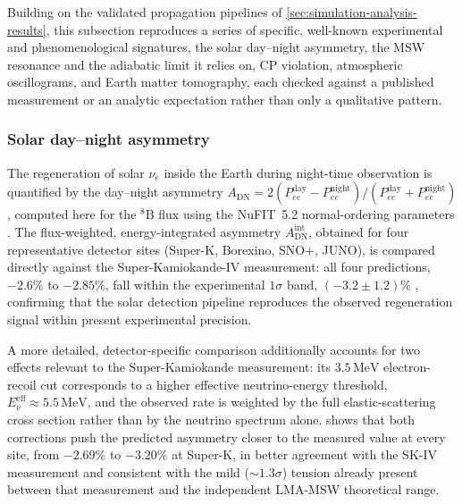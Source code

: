 Building on the validated propagation pipelines of \cref{sec:simulation-analysis-results}, this subsection reproduces a series of specific, well-known experimental and phenomenological signatures, the solar day--night asymmetry, the MSW resonance and the adiabatic limit it relies on, CP violation, atmospheric oscillograms, and Earth matter tomography, each checked against a published measurement or an analytic expectation rather than only a qualitative pattern.

\subsubsection{Solar day--night asymmetry}
\label{sec:solar-day-night}

The regeneration of solar \(\nu_e\) inside the Earth during night-time observation is quantified by the day--night asymmetry \(A_{\mathrm{DN}}=2(P_{ee}^{\mathrm{day}}-P_{ee}^{\mathrm{night}})/(P_{ee}^{\mathrm{day}}+P_{ee}^{\mathrm{night}})\), computed here for the \({}^8\mathrm{B}\) flux using the NuFIT~5.2 normal-ordering parameters \parencite{NuFit52}. The flux-weighted, energy-integrated asymmetry \(A_{\mathrm{DN}}^{\mathrm{int}}\), obtained for four representative detector sites (Super-K, Borexino, SNO+, JUNO), is compared directly against the Super-Kamiokande-IV measurement: all four predictions, \(-2.6\%\) to \(-2.85\%\), fall within the experimental \(1\sigma\) band, \((-3.2\pm1.2)\%\) \parencite{SuperKamiokande2016}, confirming that the solar detection pipeline reproduces the observed regeneration signal within present experimental precision.

A more detailed, detector-specific comparison additionally accounts for two effects relevant to the Super-Kamiokande measurement: its \(3.5\,\mathrm{MeV}\) electron-recoil cut corresponds to a higher effective neutrino-energy threshold, \(E_\nu^{\mathrm{eff}}\approx5.5\,\mathrm{MeV}\), and the observed rate is weighted by the full elastic-scattering cross section rather than by the neutrino spectrum alone.  shows that both corrections push the predicted asymmetry closer to the measured value at every site, from \(-2.69\%\) to \(-3.20\%\) at Super-K, in better agreement with the SK-IV measurement and consistent with the mild (\(\sim1.3\sigma\)) tension already present between that measurement and the independent LMA-MSW theoretical range.

